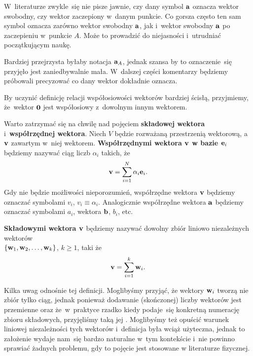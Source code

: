 \documentclass[a4paper,11pt]{article}
\begin{document}
W~literaturze zwykle~się nie pisze jawnie, czy dany symbol $\mathbf{a}$
oznacza wektor swobodny, czy wektor zaczepiony w~danym punkcie. Co gorsza
często ten sam symbol oznacza zarówno wektor swobodny $\mathbf{a}$, jak
i~wektor swobodny $\mathbf{a}$ po zaczepieniu w~punkcie $A$. Może to
prowadzić do niejasności i~utrudniać początkującym naukę.

Bardziej przejrzysta byłaby notacja $\mathbf{a}_{ A }$, jednak szansa by to
oznaczenie~się przyjęło jest zaniedbywalnie mała. W~dalszej części
komentarzy będziemy próbowali precyzować co dany wektor dokładnie oznacza.

\vspace{\spaceFour}



\noindent
{} By uczynić definicję relacji współosiowości wektorów bardziej
ścisłą, przyjmiemy, że~wektor $\mathbf{0}$ jest współosiowy z~dowolnym
innym wektorem.

\vspace{\spaceFour}





\noindent
{} Warto zatrzymać się na chwilę nad pojęciem \textbf{składowej
  wektora} i~\textbf{współrzędnej wektora}. Niech $V$ będzie rozważaną
przestrzenią wektorową, a~$\mathbf{v}$ zawartym w~niej wektorem.
\textbf{Współrzędnymi wektora $\mathbf{v}$ w bazie $\mathbf{e}_{ i }$}
będziemy nazywać ciąg liczb $\alpha_{ i }$ takich, że
\begin{equation}
  \label{eq:SkalmierskiMechanika-01}
  \mathbf{v} = \sum_{ i = 1 }^{ N } \alpha_{ i } \mathbf{e}_{ i }.
\end{equation}
Gdy nie będzie możliwości nieporozumień, współrzędne wektora $\mathbf{v}$
będziemy oznaczać symbolami $v_{ i }$, $v_{ i } \equiv \alpha_{ i }$. Analogicznie
współrzędne wektora $\mathbf{a}$ będziemy oznaczać symbolami $a_{ i }$,
wektora $\mathbf{b}$, $b_{ i }$, etc.

\textbf{Składowymi wektora $\mathbf{v}$} będziemy nazywać dowolny zbiór
liniowo niezależnych wektorów \\
$\{ \mathbf{w}_{ 1 }, \mathbf{w}_{ 2 }, \ldots, \mathbf{w}_{ k } \}$, $k \geq 1$, taki że
\begin{equation}
  \label{eq:SkalmierskiMechanika-02}
  \mathbf{v} = \sum_{ i = 1 }^{ k } \mathbf{w}_{ i }.
\end{equation}

Kilka uwag odnośnie tej definicji. Moglibyśmy przyjąć, że wektory
$\mathbf{w}_{ i }$ tworzą nie zbiór tylko ciąg, jednak ponieważ dodawanie
(skończonej) liczby wektorów jest przemienne oraz że~w~praktyce rzadko
kiedy podaje~się konkretną numerację zbioru składowych, przyjęliśmy taką
jej . Moglibyśmy też opuścić warunek liniowej niezależności tych
wektorów i~definicja była wciąż użyteczna, jednak to założenie wydaje
nam~się bardzo naturalne w~tym kontekście i~nie powinno sprawiać żadnych
problemu, gdy to pojęcie jest stosowane w literaturze fizycznej.
\end{document}
